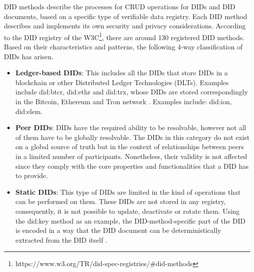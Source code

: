DID methods describe the processes for CRUD operations for DIDs and DID documents, based on a specific type of verifiable data registry. Each DID method describes and implements its own security and privacy considerations. According to the DID registry of the W3C\footnote{https://www.w3.org/TR/did-spec-registries/\#did-methods}, there are around 130 registered DID methods. Based on their characteristics and patterns, the following 4-way classification of DIDs has arisen.

\begin{itemize}
  \item \textbf{Ledger-based DIDs}: This includes all the DIDs that store DIDs in a blockchain or other Distributed Ledger Technologies (DLTs). Examples include did:btcr, did:ethr and did:trx, whose DIDs are stored correspondingly in the Bitcoin, Ethereum and Tron network \cite{preukschat_reed_2021}.
  Examples include: did:ion, did:elem.
  \item \textbf{Peer DIDs}: DIDs have the required ability to be resolvable, however not all of them have to be globally resolvable. The DIDs in this category do not exist on a global source of truth but in the context of relationships between peers in a limited number of participants. Nonetheless, their validity is not affected since they comply with the core properties and functionalities that a DID has to provide. 

  \item \textbf{Static DIDs}: This type of DIDs are limited in the kind of operations that can be performed on them. These DIDs are not stored in any registry, consequently, it is not possible to update, deactivate or rotate them. Using the did:key method as an example, the DID-method-specific part of the DID is encoded in a way that the DID document can be deterministically extracted from the DID itself \cite{longley_zagidulin_sporny_2022}.
\end{itemize}


